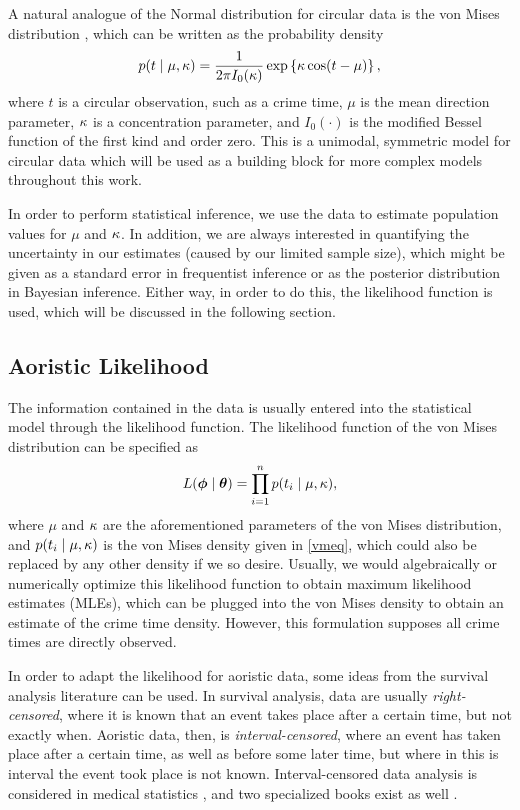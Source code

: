 A natural analogue of the Normal distribution for circular data is the von Mises distribution \citep{von1918ganzzahligkeit}, which can be written as the probability density
\begin{equation} \label{vmeq}
p(t \mid \mu, \kappa) = \frac{1}{2\pi I_0(\kappa)} \exp\left\{\kappa \cos(t - \mu)\right\},
\end{equation}
where $t$ is a circular observation, such as a crime time, $\mu$ is the mean direction parameter, $\kappa$ is a concentration parameter, and $I_0(\cdot)$ is the modified Bessel function of the first kind and order zero. This is a unimodal, symmetric model for circular data which will be used as a building block for more complex models throughout this work.

In order to perform statistical inference, we use the data to estimate population values for $\mu$ and $\kappa$. In addition, we are always interested in quantifying the uncertainty in our estimates (caused by our limited sample size), which might be given as a standard error in frequentist inference or as the posterior distribution in Bayesian inference. Either way, in order to do this, the likelihood function is used, which will be discussed in the following section.

\subsection{Aoristic Likelihood} \label{aolik}

The information contained in the data is usually entered into the statistical model through the likelihood function. The likelihood function of the von Mises distribution can be specified as
\begin{equation}
L(\boldsymbol{\phi} \mid \boldsymbol{\theta} ) = \prod_{i = 1}^n p(t_i \mid \mu, \kappa),
\end{equation}
where \( \mu\) and \(\kappa\) are the aforementioned parameters of the von Mises distribution, and \( p(t_i \mid \mu, \kappa) \) is the von Mises density given in \ref{vmeq}, which could also be replaced by any other density if we so desire. Usually, we would algebraically or numerically optimize this likelihood function to obtain maximum likelihood estimates  (MLEs), which can be plugged into the von Mises density to obtain an estimate of the crime time density. However, this formulation supposes all crime times are directly observed.

In order to adapt the likelihood for aoristic data, some ideas from the survival analysis literature can be used. In survival analysis, data are usually \textit{right-censored}, where it is known that an event takes place after a certain time, but not exactly when. Aoristic data, then, is \textit{interval-censored}, where an event has taken place after a certain time, as well as before some later time, but where in this is interval the event took place is not known. Interval-censored data analysis is considered in medical statistics \citep{klein2013handbook}, and two specialized books exist as well \citep{sun2007statistical, chen2012interval}.


